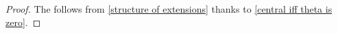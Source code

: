 \begin{proof}
  The  follows from \cref{structure of extensions} thanks to \cref{central iff theta is zero}.
\end{proof}




